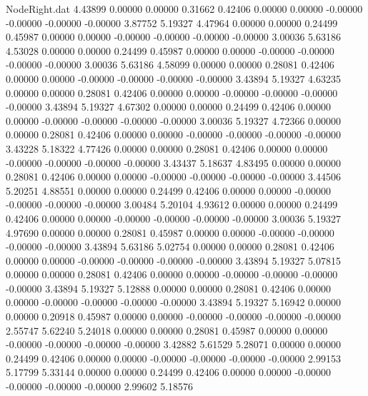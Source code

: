\begin{filecontents}{NodeRight.dat}
   4.43899    0.00000    0.00000     0.31662    0.42406    0.00000    0.00000   -0.00000   -0.00000   -0.00000   -0.00000    3.87752    5.19327
   4.47964    0.00000    0.00000     0.24499    0.45987    0.00000    0.00000   -0.00000   -0.00000   -0.00000   -0.00000    3.00036    5.63186
   4.53028    0.00000    0.00000     0.24499    0.45987    0.00000    0.00000   -0.00000   -0.00000   -0.00000   -0.00000    3.00036    5.63186
   4.58099    0.00000    0.00000     0.28081    0.42406    0.00000    0.00000   -0.00000   -0.00000   -0.00000   -0.00000    3.43894    5.19327
   4.63235    0.00000    0.00000     0.28081    0.42406    0.00000    0.00000   -0.00000   -0.00000   -0.00000   -0.00000    3.43894    5.19327
   4.67302    0.00000    0.00000     0.24499    0.42406    0.00000    0.00000   -0.00000   -0.00000   -0.00000   -0.00000    3.00036    5.19327
   4.72366    0.00000    0.00000     0.28081    0.42406    0.00000    0.00000   -0.00000   -0.00000   -0.00000   -0.00000    3.43228    5.18322
   4.77426    0.00000    0.00000     0.28081    0.42406    0.00000    0.00000   -0.00000   -0.00000   -0.00000   -0.00000    3.43437    5.18637
   4.83495    0.00000    0.00000     0.28081    0.42406    0.00000    0.00000   -0.00000   -0.00000   -0.00000   -0.00000    3.44506    5.20251
   4.88551    0.00000    0.00000     0.24499    0.42406    0.00000    0.00000   -0.00000   -0.00000   -0.00000   -0.00000    3.00484    5.20104
   4.93612    0.00000    0.00000     0.24499    0.42406    0.00000    0.00000   -0.00000   -0.00000   -0.00000   -0.00000    3.00036    5.19327
   4.97690    0.00000    0.00000     0.28081    0.45987    0.00000    0.00000   -0.00000   -0.00000   -0.00000   -0.00000    3.43894    5.63186
   5.02754    0.00000    0.00000     0.28081    0.42406    0.00000    0.00000   -0.00000   -0.00000   -0.00000   -0.00000    3.43894    5.19327
   5.07815    0.00000    0.00000     0.28081    0.42406    0.00000    0.00000   -0.00000   -0.00000   -0.00000   -0.00000    3.43894    5.19327
   5.12888    0.00000    0.00000     0.28081    0.42406    0.00000    0.00000   -0.00000   -0.00000   -0.00000   -0.00000    3.43894    5.19327
   5.16942    0.00000    0.00000     0.20918    0.45987    0.00000    0.00000   -0.00000   -0.00000   -0.00000   -0.00000    2.55747    5.62240
   5.24018    0.00000    0.00000     0.28081    0.45987    0.00000    0.00000   -0.00000   -0.00000   -0.00000   -0.00000    3.42882    5.61529
   5.28071    0.00000    0.00000     0.24499    0.42406    0.00000    0.00000   -0.00000   -0.00000   -0.00000   -0.00000    2.99153    5.17799
   5.33144    0.00000    0.00000     0.24499    0.42406    0.00000    0.00000   -0.00000   -0.00000   -0.00000   -0.00000    2.99602    5.18576

\end{filecontents}
